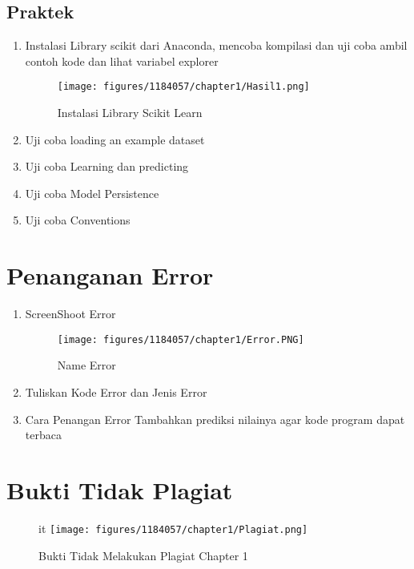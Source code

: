 \documentclass{article}
\begin{document}
\subsection{Praktek}
\begin{enumerate}
	\item Instalasi Library scikit dari Anaconda, mencoba kompilasi dan uji coba ambil contoh kode dan lihat variabel explorer
	\hfill\break
	\begin{figure}[h]
		\texttt{[image: figures/1184057/chapter1/Hasil1.png]}
		\centering
		\caption{Instalasi Library Scikit Learn}
	\end{figure}
	\newpage\item Uji coba loading an example dataset
	\hfill\break

\item Uji coba Learning dan predicting
	\hfill\break
	
\item Uji coba Model Persistence
	\hfill\break
		
	\item Uji coba Conventions
	\hfill\break
	
	\end{enumerate}


\section{Penanganan Error}
\begin{enumerate}
\item ScreenShoot Error
	\begin{figure}[h]
		\texttt{[image: figures/1184057/chapter1/Error.PNG]}
		\centering
		\caption{Name Error}
	\end{figure}
	\newpage\item Tuliskan Kode Error dan Jenis Error
	\hfill\break
	
\hfill\break
	\item Cara Penangan Error
\hfill\break Tambahkan prediksi nilainya agar kode program dapat terbaca
	\end{enumerate}
\section{Bukti Tidak Plagiat}
\begin{figure}[h]it
	\texttt{[image: figures/1184057/chapter1/Plagiat.png]}
	\centering
	\caption{Bukti Tidak Melakukan Plagiat Chapter 1}
	\end{figure}
\end{document}
